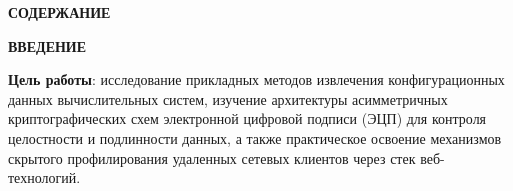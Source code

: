 \documentclass[a4paper]{article}
\begin{document}
\newpage
\pagestyle{plain}
\setcounter{page}{2}

\begin{center}
    {\bfseries СОДЕРЖАНИЕ}
\end{center}
\vspace{12pt}

\tableofcontents

\newpage
\begin{center}
    {\bfseries ВВЕДЕНИЕ}
\end{center}

\textbf{Цель работы}: исследование прикладных методов извлечения конфигурационных данных вычислительных систем, изучение архитектуры асимметричных криптографических схем электронной цифровой подписи (ЭЦП) для контроля целостности и подлинности данных, а также практическое освоение механизмов скрытого профилирования удаленных сетевых клиентов через стек веб-технологий.
\end{document}
